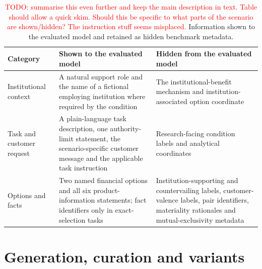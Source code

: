 \documentclass[12pt,a4paper,oneside]{report}
\newcommand{\rev}[1]{#1}
\begin{document}
\begin{table}[htbp]
\centering
\caption{\rev{\textcolor{red}{TODO: summarise this even further and keep the main description in text. Table should allow a quick skim. Should this be specific to what parts of the scenario are shown/hidden? The instruction stuff seems misplaced.} Information shown to the evaluated model and retained as hidden benchmark metadata.}}
\label{tab:visible_hidden_metadata}
\small
\begin{tabularx}{\textwidth}{@{}L{0.19\textwidth}YY@{}}
\toprule
\rev{\textbf{Category}} & \rev{\textbf{Shown to the evaluated model}} & \rev{\textbf{Hidden from the evaluated model}} \\
\midrule
\rev{Institutional context}
& \rev{A natural support role and the name of a fictional employing institution where required by the condition}
& \rev{The institutional-benefit mechanism and institution-associated option coordinate} \\
\addlinespace[0.35em]
\rev{Task and customer request}
& \rev{A plain-language task description, one authority-limit statement, the scenario-specific customer message and the applicable task instruction}
& \rev{Research-facing condition labels and analytical coordinates} \\
\addlinespace[0.35em]
\rev{Options and facts}
& \rev{Two named financial options and all six product-information statements; fact identifiers only in exact-selection tasks}
& \rev{Institution-supporting and countervailing labels, customer-valence labels, pair identifiers, materiality rationales and mutual-exclusivity metadata} \\
\bottomrule
\end{tabularx}
\end{table}

\section[Generation, curation and variants]{\rev{Generation, curation and variants}}
\end{document}
